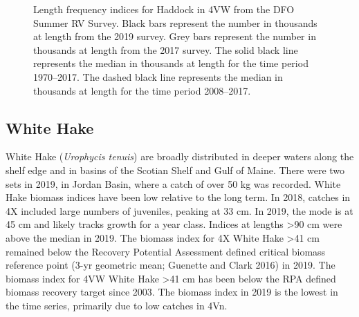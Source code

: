\documentclass[11pt]{book}
\begin{document}
\begin{figure}[htb]

{\centering {} 

}

\caption{Length frequency indices for Haddock in 4VW from the DFO Summer RV Survey. Black bars represent the number in thousands at length from the 2019 survey. Grey bars represent the number in thousands at length from the 2017 survey. The solid black line represents the median in thousands at length for the time period 1970--2017. The dashed black line represents the median in thousands at length for the time period 2008--2017.}\label{fig:18-fig-haddock-lengthfreq4VW}
\end{figure}
\clearpage

\hypertarget{white-hake}{%
\subsection{White Hake}\label{white-hake}}

White Hake (\emph{Urophycis tenuis}) are broadly distributed in deeper waters along the shelf edge and in basins of the Scotian Shelf and Gulf of Maine. There were two sets in 2019, in Jordan Basin, where a catch of over 50 kg was recorded. White Hake biomass indices have been low relative to the long term. In 2018, catches in 4X included large numbers of juveniles, peaking at 33 cm. In 2019, the mode is at 45 cm and likely tracks growth for a year class. Indices at lengths \textgreater90 cm were above the median in 2019. The biomass index for 4X White Hake \textgreater41 cm remained below the Recovery Potential Assessment defined critical biomass reference point (3-yr geometric mean; Guenette and Clark 2016) in 2019. The biomass index for 4VW White Hake \textgreater41 cm has been below the RPA defined biomass recovery target since 2003. The biomass index in 2019 is the lowest in the time series, primarily due to low catches in 4Vn.
\end{document}

